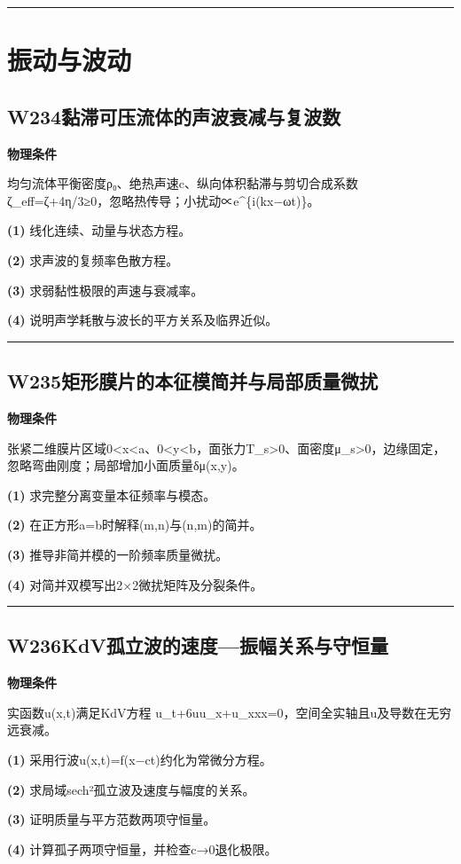 \documentclass[UTF8,a4paper,11pt,oneside,openany]{ctexbook}
\begin{document}
\par\bigskip\hrule\bigskip
\chapter{振动与波动}
\section*{W234\quad 黏滞可压流体的声波衰减与复波数}
\textbf{物理条件}\par 均匀流体平衡密度ρ₀、绝热声速c、纵向体积黏滞与剪切合成系数ζ\_eff=ζ+4η/3≥0，忽略热传导；小扰动∝e\textasciicircum{}\{i(kx−ωt)\}。
\par\noindent\textbf{(1)} 线化连续、动量与状态方程。
\par\noindent\textbf{(2)} 求声波的复频率色散方程。
\par\noindent\textbf{(3)} 求弱黏性极限的声速与衰减率。
\par\noindent\textbf{(4)} 说明声学耗散与波长的平方关系及临界近似。

\par\bigskip\hrule\bigskip
\section*{W235\quad 矩形膜片的本征模简并与局部质量微扰}
\textbf{物理条件}\par 张紧二维膜片区域0<x<a、0<y<b，面张力T\_s>0、面密度μ\_s>0，边缘固定，忽略弯曲刚度；局部增加小面质量δμ(x,y)。
\par\noindent\textbf{(1)} 求完整分离变量本征频率与模态。
\par\noindent\textbf{(2)} 在正方形a=b时解释(m,n)与(n,m)的简并。
\par\noindent\textbf{(3)} 推导非简并模的一阶频率质量微扰。
\par\noindent\textbf{(4)} 对简并双模写出2×2微扰矩阵及分裂条件。

\par\bigskip\hrule\bigskip
\section*{W236\quad KdV孤立波的速度—振幅关系与守恒量}
\textbf{物理条件}\par 实函数u(x,t)满足KdV方程 u\_t+6uu\_x+u\_xxx=0，空间全实轴且u及导数在无穷远衰减。
\par\noindent\textbf{(1)} 采用行波u(x,t)=f(x−ct)约化为常微分方程。
\par\noindent\textbf{(2)} 求局域sech²孤立波及速度与幅度的关系。
\par\noindent\textbf{(3)} 证明质量与平方范数两项守恒量。
\par\noindent\textbf{(4)} 计算孤子两项守恒量，并检查c→0退化极限。
\end{document}
